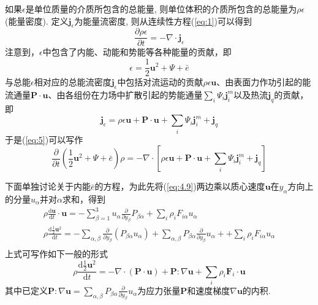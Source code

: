 \documentclass[10pt,aspectratio=43,mathserif,table]{ctexbeamer}
\newcommand{\customref}[1]{(\ref{#1})}
\begin{document}
\begin{frame}
    如果$\epsilon$是单位质量的介质所包含的总能量, 则单位体积的介质所包含的总能量为$\rho \epsilon$(能量密度). 定义$\mathbf{j}_\epsilon$为能量流密度, 则从连续性方程\customref{eq:1}可以得到
    \begin{equation}\label{eq:5}
        \frac{\partial \rho \epsilon}{\partial t}=-\nabla \cdot \mathbf{j}_\epsilon
    \end{equation}
    注意到，$\epsilon$中包含了内能、动能和势能等各种能量的贡献，即
    $$
    \epsilon =\frac{1}{2}\mathbf{u}^2+\varPsi +\bar{e}
    $$
    与总能$\epsilon$相对应的总能流密度$\mathbf{j}_\epsilon$中包括对流运动的贡献$\rho\epsilon \mathbf{u}$、由表面力作功引起的能流通量$\mathbf{P}\cdot \mathbf{u}$、由各组份在力场中扩散引起的势能通量$\sum_i{\varPsi _i\mathbf{j}_{i}^{m}}$以及热流$\mathbf{j}_q$的贡献，即
    $$
    \mathbf{j}_\epsilon =\rho \epsilon \mathbf{u}+\mathbf{P}\cdot \mathbf{u}+\sum_i{\varPsi _i\mathbf{j}_{i}^{m}}+\mathbf{j}_q
    $$
    于是\customref{eq:5}可以写作
    $$
    \frac{\partial}{\partial t}\left( \frac{1}{2}\mathbf{u}^2+\varPsi +\bar{e} \right) \rho =-\nabla \cdot \left[ \rho \epsilon \mathbf{u}+\mathbf{P}\cdot \mathbf{u}+\sum_i{\varPsi _i\mathbf{j}_{i}^{m}}+\mathbf{j}_q \right] 
    $$
\end{frame}

\begin{frame}
    下面单独讨论关于内能$\bar{e}$的方程，为此先将\customref{eq:4.9}两边乘以质心速度$\mathbf{u}$在$y_\alpha$方向上的分量$u_{\alpha}$并对$\alpha$求和，得到
    $$
    \begin{array}{c}
        \rho \frac{\mathrm{d}\mathbf{u}}{\mathrm{d}t}\cdot \mathbf{u}=-\sum_{\beta =1}^3{u_{\alpha}\frac{\partial}{\partial y_{\beta}}P_{\beta \alpha}}+\sum_i{\rho _iF_{i\alpha}u_{\alpha}}\\
        \rho \frac{\mathrm{d}\frac{1}{2}\mathbf{u}^2}{\mathrm{d}t}=-\sum_{\alpha ,\beta}{\frac{\partial}{\partial y_{\beta}}\left( P_{\beta \alpha}u_{\alpha} \right)}+\sum_{\alpha ,\beta}{P_{\beta \alpha}\frac{\partial}{\partial y_{\beta}}u_{\alpha}}++\sum_i{\rho _iF_{i\alpha}u_{\alpha}}\\
    \end{array}
    $$
    上式可写作如下一般的形式
    $$
    \rho \frac{\mathrm{d}\frac{1}{2}\mathbf{u}^2}{\mathrm{d}t}=-\nabla \cdot \left( \mathbf{P}\cdot \mathbf{u} \right) +\mathbf{P}:\nabla \mathbf{u}+\sum_i{\rho _i\mathbf{F}_i\cdot \mathbf{u}}
    $$
    其中已定义$\mathbf{P}:\nabla \mathbf{u}=\sum_{\alpha ,\beta}{P_{\beta \alpha}\frac{\partial}{\partial y_{\beta}}u_{\alpha}}$为应力张量$\mathbf{P}$和速度梯度$\nabla \mathbf{u}$的内积.

\end{frame}
\end{document}
